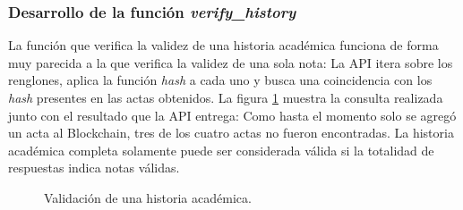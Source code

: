 \subsubsection{Desarrollo de la función \textit{verify\_history}}
La función que verifica la validez de una historia académica funciona de forma muy parecida a la que verifica la validez de una sola nota: La API itera sobre los renglones, aplica la función \textit{hash} a cada uno y busca una coincidencia con los \textit{hash} presentes en las actas obtenidos. La figura \ref{fig:validate_history_api} muestra la consulta realizada junto con el resultado que la API entrega: Como hasta el momento solo se agregó un acta al Blockchain, tres de los cuatro actas no fueron encontradas. La historia académica completa solamente puede ser considerada válida si la totalidad de respuestas indica notas válidas.
\begin{figure}
    \caption{Validación de una historia académica.}
    \label{fig:validate_history_api}
\end{figure}
